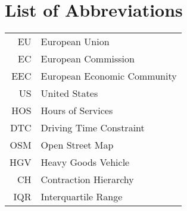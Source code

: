 

\appendix

{}	%
{}	%

\section{List of Abbreviations\label{app:abb}}

\begin{tabular}{rp{}}
	EU          & European Union                                                                                                               \\
	EC          & European Commission                                                                                                          \\
	EEC         & European Economic Community                                                                                                  \\
	US          & United States                                                                                                                \\
	HOS         & Hours of Services                                                                                                            \\
	DTC         & Driving Time Constraint                                                                                                      \\
	OSM         & Open Street Map                                                                                                              \\
	HGV         & Heavy Goods Vehicle                                                                                                          \\
	CH          & Contraction Hierarchy                                                                                                        \\
	IQR         & Interquartile Range                                                                                                          \\

\end{tabular}
